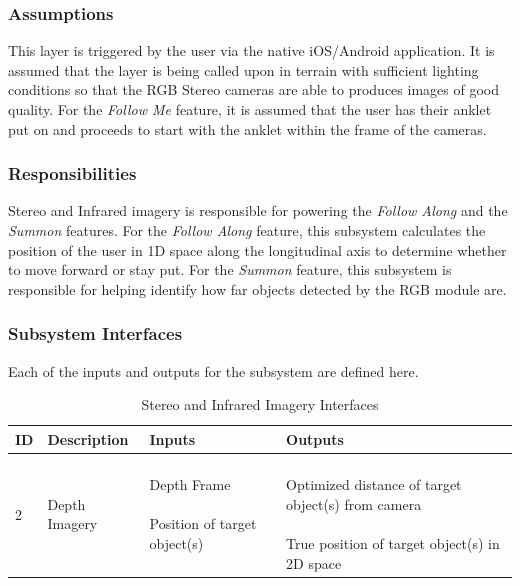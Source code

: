\subsubsection{Assumptions}
This layer is triggered by the user via the native iOS/Android application. It is assumed that the layer is being called upon in terrain with sufficient lighting conditions so that the RGB Stereo cameras are able to produces images of good quality. For the \textit{Follow Me} feature, it is assumed that the user has their anklet put on and proceeds to start with the anklet within the frame of the cameras. 

\subsubsection{Responsibilities}
Stereo and Infrared imagery is responsible for powering the \textit{Follow Along} and the \textit{Summon} features. For the \textit{Follow Along} feature, this subsystem calculates the position of the user in 1D space along the longitudinal axis to determine whether to move forward or stay put. For the \textit{Summon} feature, this subsystem is responsible for helping identify how far objects detected by the RGB module are. 

\subsubsection{Subsystem Interfaces}
Each of the inputs and outputs for the subsystem are defined here.

\begin {table}[H]
\caption {Stereo and Infrared Imagery Interfaces} 
\begin{center}
    \begin{tabular}{ | p{1cm} | p{6cm} | p{3cm} | p{3cm} |}
    \hline
    ID & Description & Inputs & Outputs \\ \hline
    2 & Depth Imagery & \pbox{3cm}{Depth Frame \\ \\ Position of target object(s)} & \pbox{3cm}{\phantom{Boo!}\\ Optimized distance of target object(s) from camera\\ \\True position of target object(s) in 2D space\\}  \\ \hline
    \end{tabular}
\end{center}
\end{table}
